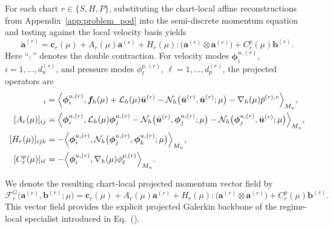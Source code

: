 For each chart $r\in\{S,H,P\}$, substituting the chart-local affine reconstructions
from Appendix~\ref{app:problem_pod} into the semi-discrete
momentum equation and testing against the local velocity basis yields
\begin{equation}
    \dot{\bm a}^{(r)}
    =
    \bm c_r(\mu)
    +
    A_r(\mu)\bm a^{(r)}
    +
    H_r(\mu):
    \bigl(
        \bm a^{(r)}\otimes\bm a^{(r)}
    \bigr)
    +
    C_r^p(\mu)\bm b^{(r)}.
    \label{eq:app_projected_momentum}
\end{equation}
Here ``$:$'' denotes the double contraction.
For velocity modes
$\bm\phi_i^{u,(r)}$,
$i=1,\ldots,d_u^{(r)}$,
and pressure modes
$\phi_\ell^{p,(r)}$,
$\ell=1,\ldots,d_p^{(r)}$,
the projected operators are
\begin{align}
    [\bm c_r(\mu)]_i
    &=
    \Bigl\langle
        \bm\phi_i^{u,(r)},
        \bm f_h(\mu)
        +
        \mathcal L_h(\mu)\bar{\bm u}^{(r)}
        -
        \mathcal N_h
        \bigl(
            \bar{\bm u}^{(r)},
            \bar{\bm u}^{(r)};
            \mu
        \bigr)
        -
        \nabla_h(\mu)\bar p^{(r),\circ}
    \Bigr\rangle_{M_u},
    \\
    [A_r(\mu)]_{ij}
    &=
    \Bigl\langle
        \bm\phi_i^{u,(r)},
        \mathcal L_h(\mu)\bm\phi_j^{u,(r)}
        -
        \mathcal N_h
        \bigl(
            \bar{\bm u}^{(r)},
            \bm\phi_j^{u,(r)};
            \mu
        \bigr)
        -
        \mathcal N_h
        \bigl(
            \bm\phi_j^{u,(r)},
            \bar{\bm u}^{(r)};
            \mu
        \bigr)
    \Bigr\rangle_{M_u},
    \\
    [H_r(\mu)]_{ijk}
    &=
    -
    \Bigl\langle
        \bm\phi_i^{u,(r)},
        \mathcal N_h
        \bigl(
            \bm\phi_j^{u,(r)},
            \bm\phi_k^{u,(r)};
            \mu
        \bigr)
    \Bigr\rangle_{M_u},
    \\
    [C_r^p(\mu)]_{i\ell}
    &=
    -
    \Bigl\langle
        \bm\phi_i^{u,(r)},
        \nabla_h(\mu)\phi_\ell^{p,(r)}
    \Bigr\rangle_{M_u}.
    \label{eq:app_projected_operators}
\end{align}

We denote the resulting chart-local projected momentum vector field by
\begin{equation}
    \mathcal F_r^G
    \bigl(
        \bm a^{(r)},
        \bm b^{(r)};
        \mu
    \bigr)
    =
    \bm c_r(\mu)
    +
    A_r(\mu)\bm a^{(r)}
    +
    H_r(\mu):
    \bigl(
        \bm a^{(r)}\otimes\bm a^{(r)}
    \bigr)
    +
    C_r^p(\mu)\bm b^{(r)}.
    \label{eq:app_galerkin_backbone}
\end{equation}
This vector field provides the explicit projected Galerkin backbone of the
regime-local specialist introduced in
Eq.~().


